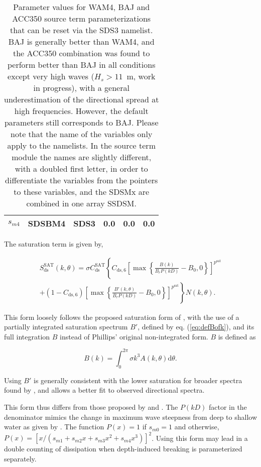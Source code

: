 \begin{table}
\begin{center}
\begin{tabular}{|l|c|c|c|c|c|}
  $s_{m4}$                          & SDSBM4          & SDS3  & 0.0 & 0.0 &  0.0  \\
 \hline \hline
\end{tabular} \end{center}
\caption{Parameter values for WAM4, BAJ and ACC350 source term
parameterizations that can be reset via the SDS3 namelist. BAJ is generally
better than WAM4, and the ACC350 combination was found to perform better than
BAJ in all conditions except very high waves ($H_s > 11$~m, work in progress),
with a general underestimation of the directional spread at high frequencies.
However, the default parameters still corresponds to BAJ. Please note that the
name of the variables only apply to the namelists. In the source term module
the names are slightly different, with a doubled first letter, in order to
differentiate the variables from the pointers to these variables, and the SDSMx
are combined in one array SSDSM.} \label{tab:WAM4_parSDS}
\end{table}

The saturation term is given by,

\begin{eqnarray}
S_{\mathrm{ds}}^{\mathrm{SAT}}\left(k,\theta\right) = \sigma
 C_{\mathrm{ds}}^{\mathrm{SAT}}\left\{
C_{\mathrm{ds},6} \left[ \max\left\{\frac{B\left(k\right)}{B_r P(k D)} - B_0
 ,0\right\}\right]^{p^{\mathrm{sat}}} \right. \nonumber \\
 +\left.\left(1-C_{\mathrm{ds},6}\right) \left[
\max\left\{\frac{B'\left(k,\theta\right)}{B_r P(k D)} - B_0
 ,0\right\}\right]^{p^{\mathrm{sat}}} \right\} \label{eq:Sds_sat}
N\left(k,\theta\right) .
\end{eqnarray}

\noindent 
This form loosely follows the proposed saturation form of \cite{art:Phi84},
with the use of a partially integrated saturation spectrum $B'$, defined by
eq. (\ref{eq:defBofk}), and its full integration $B$ instead of Phillips'
original non-integrated form. $B$ is defined as

\begin{equation}
B\left(k\right)=\int_{0}^{2 \pi} \sigma k^3 A(k,\theta) \mathrm d \theta
\label{eq:defBofkint}.
\end{equation}

\noindent
Using $B'$ is generally consistent with the lower saturation for broader
spectra found by \cite{art:BGM02}, and allows a better fit to observed
directional spectra.

This form thus differs from those proposed by \cite{art:ABJ03} and
\cite{art:Wea07}. The $P(kD)$ factor in the denominator mimics the change in
maximum wave steepness from deep to shallow water as given by
\cite{art:Miche44}. The function $P(x)=1$ if $s_{m0}=1$ and otherwise,
$P(x)=\left[x/\left(s_{m1}+s_{m2}x+s_{m3}x^2+s_{m4}x^3\right)\right]^2$. Using
this form may lead in a double counting of dissipation when depth-induced
breaking is parameterized separately.

